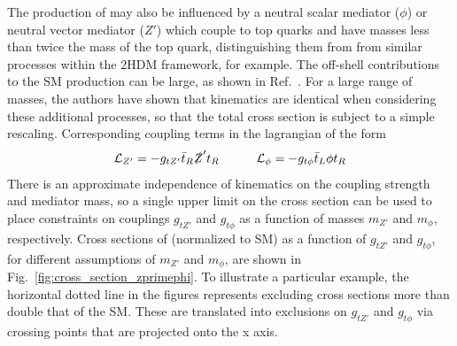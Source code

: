 The production of \tttt may also be influenced by a neutral scalar mediator
($\phi$) or neutral vector mediator ($Z'$) which couple to top quarks and have
masses less than twice the mass of the top quark, distinguishing them from
from similar processes within the 2HDM framework, for example. The off-shell contributions
to the SM \tttt production can be large, as shown in
Ref.~\cite{THEORY:Alvarez2016nrz}. For a large range of masses, the authors have
shown that kinematics are identical when considering these additional
processes, so that the total \tttt cross section is subject to a simple
rescaling.  Corresponding coupling terms in the lagrangian of the form
\begin{equation}
    \mathcal{L}_{Z'}=-g_{t Z'}\bar{t}_R \slashed{Z}' t_R
    \quad\quad\quad
    \mathcal{L}_{\phi}=-g_{t \phi}\bar{t}_L \phi t_R
\end{equation}
There is an approximate independence of kinematics on the coupling strength and mediator mass,
so a single upper limit on the \tttt cross section can be used to place constraints 
on couplings $g_{tZ'}$ and $g_{t\phi}$ as a function of masses $m_{Z'}$ and $m_{\phi}$,
respectively.
Cross sections of \tttt (normalized to SM) as a function of $g_{tZ'}$ 
and $g_{t\phi}$, for different assumptions of $m_{Z'}$ and $m_{\phi}$,
are shown in Fig.~\ref{fig:cross_section_zprimephi}. To illustrate a particular example,
the horizontal dotted line in the figures represents excluding cross sections more than
double that of the SM. These are translated into exclusions on $g_{tZ'}$ and $g_{t\phi}$
via crossing points that are projected onto the x axis.

